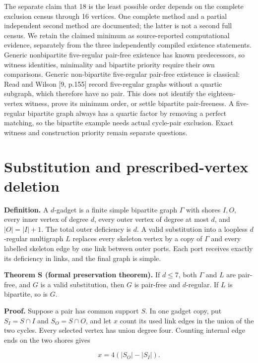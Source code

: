 \documentclass[smallextended]{svjour3}
\begin{document}
The separate claim that 18 is the least possible order depends on the
complete exclusion census through 16 vertices. One complete method and a
partial independent second method are documented; the latter is not a
second full census. We retain the claimed minimum as source-reported
computational evidence, separately from the three independently compiled
existence statements. Generic nonbipartite five-regular pair-free
existence has known predecessors, so witness identities, minimality and
bipartite priority require their own comparisons. Generic non-bipartite
five-regular pair-free existence is classical: Read and Wilson {[}9,
p.155{]} record five-regular graphs without a quartic subgraph, which
therefore have no pair. This does not identify the eighteen-vertex
witness, prove its minimum order, or settle bipartite pair-freeness. A
five-regular bipartite graph always has a quartic factor by removing a
perfect matching, so the bipartite example needs actual cycle-pair
exclusion. Exact witness and construction priority remain separate
questions.

\section{Substitution and prescribed-vertex
deletion}\label{substitution-and-prescribed-vertex-deletion}

\textbf{Definition.} A \(d\)-gadget is a finite simple bipartite graph
\(\Gamma\) with shores \(I,O\), every inner vertex of degree \(d\),
every outer vertex of degree at most \(d\), and \(|O|=|I|+1\). The total
outer deficiency is \(d\). A valid substitution into a loopless
\(d\)-regular multigraph \(L\) replaces every skeleton vertex by a copy
of \(\Gamma\) and every labelled skeleton edge by one link between outer
ports. Each port receives exactly its deficiency in links, and the final
graph is simple.

\textbf{Theorem S (formal preservation theorem).} If \(d\leq7\), both
\(\Gamma\) and \(L\) are pair-free, and \(G\) is a valid substitution,
then \(G\) is pair-free and \(d\)-regular. If \(L\) is bipartite, so is
\(G\).

\textbf{Proof.} Suppose a pair has common support \(S\). In one gadget
copy, put \(S_I=S\cap I\) and \(S_O=S\cap O\), and let \(x\) count its
used link edges in the union of the two cycles. Every selected vertex
has union degree four. Counting internal edge ends on the two shores
gives

\[
x=4(|S_O|-|S_I|).
\]
\end{document}
